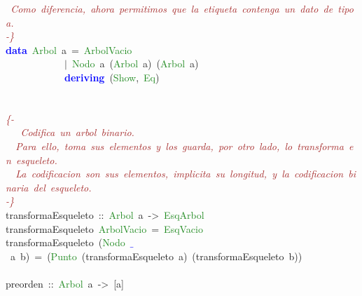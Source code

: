 \begin{allintypewriter}
\mbox{}\textit{\textcolor{Brown}{\ Como\ diferencia,\ ahora\ permitimos\ que\ la\ etiqueta\ contenga\ un\ dato\ de\ tipo\ a.}} \\
\mbox{}\textit{\textcolor{Brown}{-\}}} \\
\mbox{}\textbf{\textcolor{Blue}{data}}\ \textcolor{ForestGreen}{Arbol}\ a\ \textcolor{BrickRed}{=}\ \textcolor{ForestGreen}{ArbolVacio}\  \\
\mbox{}\ \ \ \ \ \ \ \ \ \ \ \ \textcolor{BrickRed}{$|$}\ \textcolor{ForestGreen}{Nodo}\ a\ \textcolor{BrickRed}{(}\textcolor{ForestGreen}{Arbol}\ a\textcolor{BrickRed}{)}\ \textcolor{BrickRed}{(}\textcolor{ForestGreen}{Arbol}\ a\textcolor{BrickRed}{)} \\
\mbox{}\ \ \ \ \ \ \ \ \ \ \ \ \textbf{\textcolor{Blue}{deriving}}\ \textcolor{BrickRed}{(}\textcolor{ForestGreen}{Show}\textcolor{BrickRed}{,}\ \textcolor{ForestGreen}{Eq}\textcolor{BrickRed}{)} \\
\mbox{} \\
\mbox{} \\
\mbox{}\textit{\textcolor{Brown}{\{-}} \\
\mbox{}\textit{\textcolor{Brown}{\ \ \ Codifica\ un\ arbol\ binario.}} \\
\mbox{}\textit{\textcolor{Brown}{\ \ Para\ ello,\ toma\ sus\ elementos\ y\ los\ guarda,\ por\ otro\ lado,\ lo\ transforma\ en\ esqueleto.\ }} \\
\mbox{}\textit{\textcolor{Brown}{\ \ La\ codificacion\ son\ sus\ elementos,\ implicita\ su\ longitud,\ y\ la\ codificacion\ binaria\ del\ esqueleto.}} \\
\mbox{}\textit{\textcolor{Brown}{-\}}} \\
\mbox{}transformaEsqueleto\ \textcolor{BrickRed}{::}\ \textcolor{ForestGreen}{Arbol}\ a\ \textcolor{BrickRed}{-\textgreater{}}\ \textcolor{ForestGreen}{EsqArbol} \\
\mbox{}transformaEsqueleto\ \textcolor{ForestGreen}{ArbolVacio}\ \textcolor{BrickRed}{=}\ \textcolor{ForestGreen}{EsqVacio} \\
\mbox{}transformaEsqueleto\ \textcolor{BrickRed}{(}\textcolor{ForestGreen}{Nodo}\ \textbf{\textcolor{Blue}{$\_$}}\ a\ b\textcolor{BrickRed}{)}\ \textcolor{BrickRed}{=}\ \textcolor{BrickRed}{(}\textcolor{ForestGreen}{Punto}\ \textcolor{BrickRed}{(}transformaEsqueleto\ a\textcolor{BrickRed}{)}\ \textcolor{BrickRed}{(}transformaEsqueleto\ b\textcolor{BrickRed}{))} \\
\mbox{} \\
\mbox{}preorden\ \textcolor{BrickRed}{::}\ \textcolor{ForestGreen}{Arbol}\ a\ \textcolor{BrickRed}{-\textgreater{}}\ \textcolor{BrickRed}{[}a\textcolor{BrickRed}{]} \\

\end{allintypewriter}
